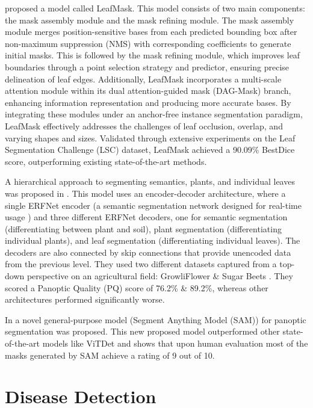 \documentclass[draft,final]{vutinfth} %
\begin{document}
 \cite{guo_leafmask_2021} proposed a model called LeafMask. This model consists of two main components: the mask assembly module and the mask refining module. The mask assembly module merges position-sensitive bases from each predicted bounding box after non-maximum suppression (NMS) with corresponding coefficients to generate initial masks. This is followed by the mask refining module, which improves leaf boundaries through a point selection strategy and predictor, ensuring precise delineation of leaf edges. Additionally, LeafMask incorporates a multi-scale attention module within its dual attention-guided mask (DAG-Mask) branch, enhancing information representation and producing more accurate bases. By integrating these modules under an anchor-free instance segmentation paradigm, LeafMask effectively addresses the challenges of leaf occlusion, overlap, and varying shapes and sizes. Validated through extensive experiments on the Leaf Segmentation Challenge (LSC) dataset, LeafMask achieved a 90.09\% BestDice score, outperforming existing state-of-the-art methods.

A hierarchical approach to segmenting semantics, plants, and individual leaves was proposed in
\cite{roggiolani_hierarchical_2023}. This model uses an encoder-decoder architecture, where a single ERFNet encoder (a semantic segmentation network designed for real-time usage \cite{romera_erfnet_2018}) and three different ERFNet decoders, one for semantic segmentation (differentiating between plant and soil), plant segmentation (differentiating individual plants), and leaf segmentation (differentiating individual leaves). The decoders are also connected by skip connections that provide unencoded data from the previous level. They used two different datasets captured from a top-down perspective on an agricultural field: GrowliFlower \cite{kierdorf_growliflower_2023} \& Sugar Beets \cite{chebrolu_agricultural_2017}.
They scored a Panoptic Quality (PQ) score of 76.2\% \& 89.2\%, whereas other architectures performed significantly worse.  

In \cite{kirillov_segment_2023} a novel general-purpose model (Segment Anything Model (SAM)) for panoptic segmentation was proposed. This new proposed model outperformed other state-of-the-art models like ViTDet and shows that upon human evaluation most of the masks generated by SAM achieve a rating of 9 out of 10.

\section{Disease Detection} \label{sec:disease_detection}
\end{document}
